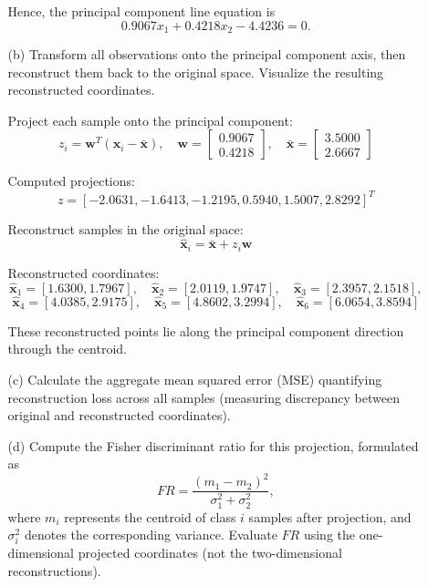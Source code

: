 \documentclass[11pt,addpoints,answers]{exam}
\begin{document}
\begin{enumerate}
\begin{enumerate}
\begin{your_solution}[title=Principal Component Equation, height=12cm]
				Hence, the principal component line equation is
				\[
				\boxed{0.9067 x_1 + 0.4218 x_2 - 4.4236 = 0}.
				\]

			\end{your_solution}
			\item[(b)] Transform all observations onto the principal component axis, then reconstruct them back to the original space. Visualize the resulting reconstructed coordinates.
			

			\begin{your_solution}[title=Projection and Reconstruction, height=9cm]
			Project each sample onto the principal component:
			\[
			z_i = \mathbf{w}^T (\mathbf{x}_i - \bar{\mathbf{x}}), \quad \mathbf{w} = \begin{bmatrix}0.9067 \\ 0.4218\end{bmatrix}, \quad \bar{\mathbf{x}} = \begin{bmatrix}3.5000 \\ 2.6667\end{bmatrix}
			\]

			Computed projections:
			\[
			z = [-2.0631, -1.6413, -1.2195, 0.5940, 1.5007, 2.8292]^T
			\]

			Reconstruct samples in the original space:
			\[
			\hat{\mathbf{x}}_i = \bar{\mathbf{x}} + z_i \mathbf{w}
			\]

			Reconstructed coordinates:
			\[
			\hat{\mathbf{x}}_1 = [1.6300, 1.7967], \quad
			\hat{\mathbf{x}}_2 = [2.0119, 1.9747], \quad
			\hat{\mathbf{x}}_3 = [2.3957, 2.1518],
			\]
			\[
			\hat{\mathbf{x}}_4 = [4.0385, 2.9175], \quad
			\hat{\mathbf{x}}_5 = [4.8602, 3.2994], \quad
			\hat{\mathbf{x}}_6 = [6.0654, 3.8594]
			\]

			These reconstructed points lie along the principal component direction through the centroid.
			\end{your_solution}
			\item[(c)] Calculate the aggregate mean squared error (MSE) quantifying reconstruction loss across all samples (measuring discrepancy between original and reconstructed coordinates).
			
			\item[(d)] Compute the Fisher discriminant ratio for this projection, formulated as 
			\[
			FR = \frac{(m_{1} - m_{2})^{2}}{\sigma_{1}^{2} + \sigma_{2}^{2}},
			\]
			where $m_{i}$ represents the centroid of class $i$ samples after projection, and $\sigma_{i}^{2}$ denotes the corresponding variance. Evaluate $FR$ using the one-dimensional projected coordinates (not the two-dimensional reconstructions).
		\end{enumerate}
		

\end{enumerate}
\end{document}
